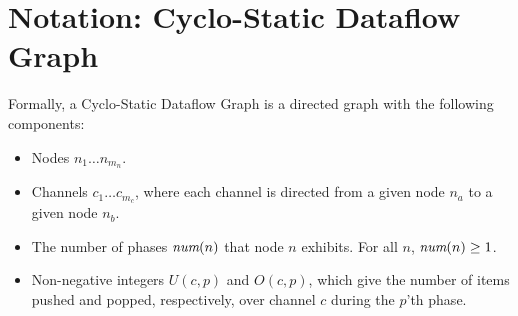 \section{Notation: Cyclo-Static Dataflow Graph}
\label{sec:pcg}


Formally, a Cyclo-Static Dataflow Graph is a directed graph with the
following components:
\begin{itemize}

\item Nodes $n_1 \dots n_{m_n}$.

\item Channels $c_1 \dots c_{m_c}$, where each channel is directed
from a given node $n_a$ to a given node $n_b$.

\item The number of phases $\mbox{\it num}(n)$ that node $n$ exhibits.  For
all $n$, $\mbox{\it num}(n) \ge 1$.

\item Non-negative integers $U(c, p)$ and $O(c, p)$, which give the
number of items pushed and popped, respectively, over channel $c$
during the $p$'th phase.


\end{itemize}

